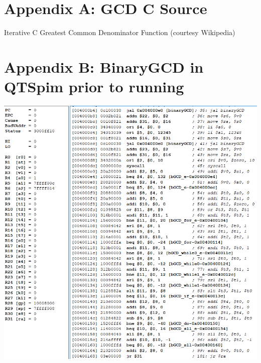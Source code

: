 \documentclass[12pt,letterpaper,titlepage]{article}
\begin{document}
\begin{raggedright}
\clearpage
\section{Appendix A: GCD C Source}
\begin{center}


Iterative C Greatest Common Denominator Function (courtesy Wikipedia)
\end{center}

\clearpage
\section{Appendix B: BinaryGCD in QTSpim prior to running}
\begin{center}
\includegraphics[width=\textwidth, height=\textheight, keepaspectratio=true]{pre}
\end{center}

\clearpage

\end{raggedright}
\end{document}
